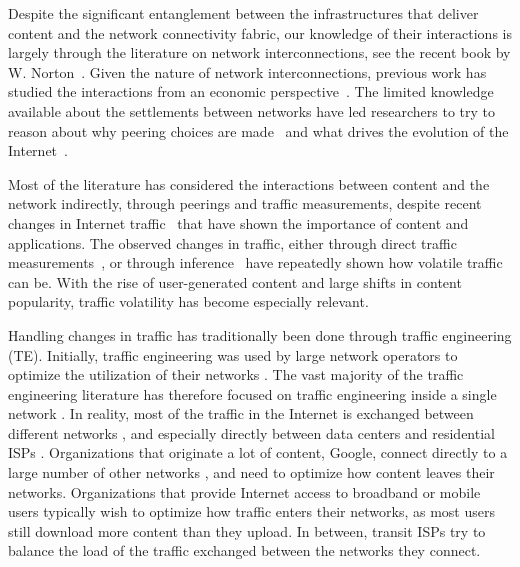 Despite the significant entanglement between the infrastructures that deliver
content and the network connectivity fabric, our knowledge of their
interactions is largely through the literature on network interconnections, \eg
see the recent book by W. Norton~\cite{peering-playbook}. Given the nature of
network interconnections, previous work has studied the interactions from an
economic perspective~\cite
{internet-economics,interactions-economics,content-oriented-economics}. The
limited knowledge available about the settlements between networks have led
researchers to try to reason about why peering choices are made~\cite
{ToPeerOrNot:Infocom2006} and what drives the evolution of the
Internet~\cite{evolution}.

Most of the literature has considered the interactions between content and the
network indirectly, \eg through peerings and traffic measurements, despite
recent changes in Internet traffic~\cite{TrafficTypesGrowth:2011,arbor} that
have shown the importance of content and applications.  The observed changes in
traffic, either through direct traffic measurements~\cite
{TrafficDemand:ToN2001,Feldmann:Kammenhuber:2004,uhlig-public,arbor,IXPSIGCOMM2012},
or through
inference~\cite{medina_tm:2002,zhang_tm:2003,zhang_link:2003,gunnar_estimation:2004,dina_distributed:2004,soule_tm:2005}
have repeatedly shown how volatile traffic can be. With the rise of
user-generated content and large shifts in content popularity, traffic
volatility has become especially relevant.

Handling changes in traffic has traditionally been done through traffic
engineering (TE). Initially, traffic engineering was used by large network
operators to optimize the utilization of their networks
\cite{Awduche_OverviewTE:2002}. The vast majority of the traffic engineering
literature has therefore focused on traffic engineering inside a single network
\cite{netscope,FT00,Xiao_Traffic:2000,Aukia_RATES:2000,MPLS:Infocom2000,FT01}.
In reality, most of the traffic in the Internet is exchanged between different
networks \cite{arbor}, and especially directly between data centers and
residential ISPs \cite{IXPSIGCOMM2012}. Organizations that originate a lot of
content, \eg Google, connect directly to a large number of other networks
\cite{arbor}, and need to optimize how content leaves their networks.
Organizations that provide Internet access to broadband or mobile users
typically wish to optimize how traffic enters their networks, as most users
still download more content than they upload. In between, transit ISPs try to
balance the load of the traffic exchanged between the networks they connect.

